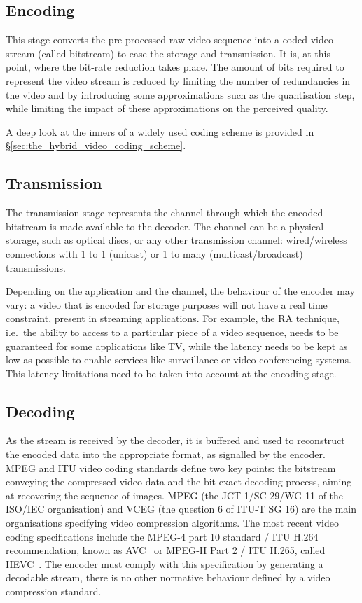 \documentclass[11pt,a4paper,openright,twoside]{book}
\numberwithin{equation}{section} %
\numberwithin{figure}{section} %
\numberwithin{table}{section} %
\begin{document}
\subsection{Encoding}
\label{sub:encoding}

This stage converts the pre-processed raw video sequence into a coded video
stream (called bitstream) to ease the storage and transmission.
It is, at this point, where the bit-rate reduction takes place.
The amount of bits required to represent the video stream is reduced by
limiting the number of redundancies in the video and by introducing some
approximations such as the quantisation step, while limiting the impact of
these approximations on the perceived quality.

A deep look at the inners of a widely used coding scheme is provided
in \S\ref{sec:the_hybrid_video_coding_scheme}.

\subsection{Transmission}
\label{sub:transmission}

The transmission stage represents the channel through which the encoded
bitstream is made available to the decoder.
The channel can be a physical storage, such as optical discs, or any other
transmission channel: wired/wireless connections with 1 to 1 (unicast) or 1 to
many (multicast/broadcast) transmissions.

Depending on the application and the channel, the behaviour of the encoder may
vary:
a video that is encoded for storage purposes will not have a real time
constraint, present in streaming applications.
For example, the \ac{RA} technique, i.e.\ the ability to access to a
particular piece of a video sequence, needs to be guaranteed for some
applications like TV, while the latency needs to be kept as low as possible to
enable services like surveillance or video conferencing systems.
This latency limitations need to be taken into account at the encoding stage.

\subsection{Decoding}
\label{sub:decoding}

As the stream is received by the decoder, it is buffered and used to
reconstruct the encoded data into the appropriate format, as signalled
by the encoder.
\acs{MPEG} and \acs{ITU} video coding standards define two key points:
the bitstream conveying the
compressed video data and the bit-exact decoding process, aiming at recovering
the sequence of images.
\acs{MPEG} (the \acs{JCT} 1/SC 29/WG 11 of the \acs{ISO}/\acs{IEC}
organisation) and \acs{VCEG} (the question 6 of ITU-T SG 16) are the main
organisations specifying video compression algorithms.
The most recent video coding specifications include the \acs{MPEG}-4 part 10
standard / \acs{ITU} H.264 recommendation, known as \ac{AVC}~\cite{itu-03-avc}
or \acs{MPEG}-H Part 2 / \acs{ITU} H.265, called
\acf{HEVC}~\cite{itu-13-hevc}.
The encoder must comply with this specification by generating a decodable
stream, there is no other normative behaviour defined by a video compression
standard.
\end{document}
